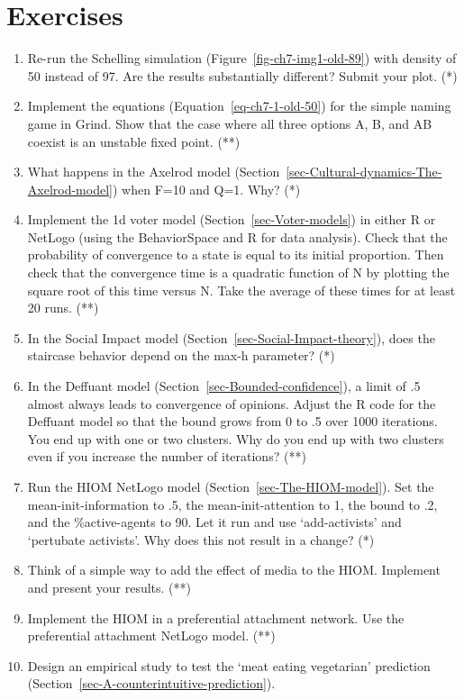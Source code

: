 \documentclass[
  a4paper,
  DIV=11,
  numbers=noendperiod]{scrreprt}
\begin{document}
\hypertarget{sec-Exercises}{%
\section{Exercises}\label{sec-Exercises}}

\begin{enumerate}
\def\labelenumi{\arabic{enumi})}
\item
  Re-run the Schelling simulation (Figure~\ref{fig-ch7-img1-old-89})
  with density of 50 instead of 97. Are the results substantially
  different? Submit your plot. (*)
\item
  Implement the equations (Equation~\ref{eq-ch7-1-old-50}) for the
  simple naming game in Grind. Show that the case where all three
  options A, B, and AB coexist is an unstable fixed point. (**)
\item
  What happens in the Axelrod model
  (Section~\ref{sec-Cultural-dynamics-The-Axelrod-model}) when F=10 and
  Q=1. Why? (*)
\item
  Implement the 1d voter model (Section~\ref{sec-Voter-models}) in
  either R or NetLogo (using the BehaviorSpace and R for data analysis).
  Check that the probability of convergence to a state is equal to its
  initial proportion. Then check that the convergence time is a
  quadratic function of N by plotting the square root of this time
  versus N. Take the average of these times for at least 20 runs. (**)
\item
  In the Social Impact model (Section~\ref{sec-Social-Impact-theory}),
  does the staircase behavior depend on the max-h parameter? (*)
\item
  In the Deffuant model (Section~\ref{sec-Bounded-confidence}), a limit
  of .5 almost always leads to convergence of opinions. Adjust the R
  code for the Deffuant model so that the bound grows from 0 to .5 over
  1000 iterations. You end up with one or two clusters. Why do you end
  up with two clusters even if you increase the number of iterations?
  (**)
\item
  Run the HIOM NetLogo model (Section~\ref{sec-The-HIOM-model}). Set the
  mean-init-information to .5, the mean-init-attention to 1, the bound
  to .2, and the \%active-agents to 90. Let it run and use
  `add-activists' and `pertubate activists'. Why does this not result in
  a change? (*)
\item
  Think of a simple way to add the effect of media to the HIOM.
  Implement and present your results. (**)
\item
  Implement the HIOM in a preferential attachment network. Use the
  preferential attachment NetLogo model. (**)
\item
  Design an empirical study to test the `meat eating vegetarian'
  prediction (Section~\ref{sec-A-counterintuitive-prediction}).
\end{enumerate}
\end{document}
